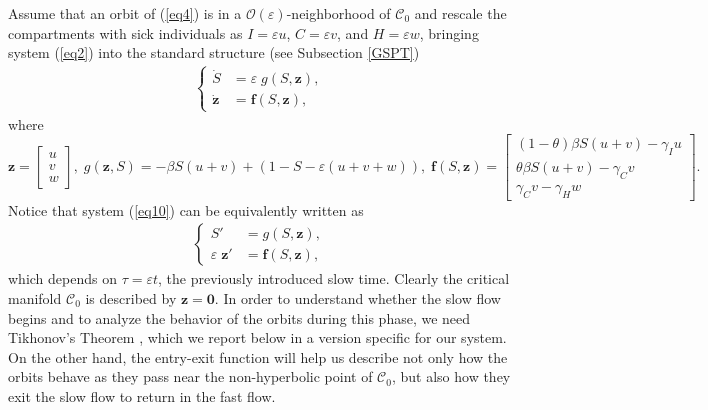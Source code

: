 \documentclass[11pt,reqno]{amsart}
\theoremstyle{boldremark}
\begin{document}
Assume that an orbit of (\ref{eq4}) is in a $\mathcal{O}(\varepsilon)$-neighborhood of $\mathcal{C}_0$ and rescale the compartments with sick individuals as $I=\varepsilon u$, $C=\varepsilon v$, and $H=\varepsilon w$, bringing system (\ref{eq2}) into the standard structure (see Subsection \ref{GSPT}) 
\begin{align} \label{eq10}
\left\{
\begin{aligned}
    \dot{S}&=\varepsilon \; g(S,\mathbf{z}), \\ 
    \dot{\mathbf{z}}&=\mathbf{f}(S,\mathbf{z}), 
\end{aligned}
\right.
\end{align}
where
\begin{equation*} 
    \mathbf{z}=
    \begin{bmatrix}
        u \\ v \\ w
    \end{bmatrix}, \; 
    g(\mathbf{z}, S)=-\beta S (u+v) + (1-S-\varepsilon(u+v+w)), \;
    \mathbf{f}(S,\mathbf{z}) = 
    \begin{bmatrix}
        (1-\theta) \beta S (u+v) - \gamma_I u \\ 
        \theta \beta S(u+v) - \gamma_C v \\ 
        \gamma_C v - \gamma_H w 
    \end{bmatrix}. 
\end{equation*}
Notice that system (\ref{eq10}) can be equivalently written as 
\begin{align} \label{eq12}
\left\{
\begin{aligned}
    S' &= g(S,\mathbf{z}), \\ 
    \varepsilon \; \mathbf{z}' &=\mathbf{f}(S,\mathbf{z}), 
\end{aligned}
\right.
\end{align}
which depends on $\tau=\varepsilon t$, the previously introduced slow time. Clearly the critical manifold $\mathcal{C}_0$ is described by $\mathbf{z}=\mathbf{0}$. In order to understand whether the slow flow begins and to analyze the behavior of the orbits during this phase, we need Tikhonov's Theorem \cite[Theorem 4.1.2]{2}, which we report below in a version specific for our system. On the other hand, the entry-exit function will help us describe not only how the orbits behave as they pass near the non-hyperbolic point of $\mathcal{C}_0$, but also how they exit the slow flow to return in the fast flow. 
\end{document}
